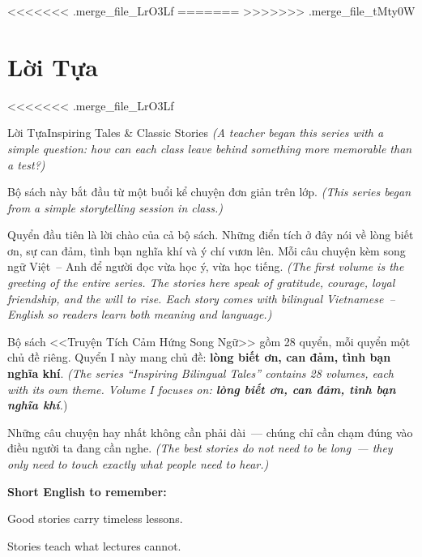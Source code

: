 <<<<<<< .merge_file_LrO3Lf
=======
>>>>>>> .merge_file_tMty0W
\chapter*{Lời Tựa}

<<<<<<< .merge_file_LrO3Lf
\begin{truyen}{Lời Tựa}{Inspiring Tales \& Classic Stories}
\textit{(A teacher began this series with a simple question: how can each class leave behind something more memorable than a test?)}

Bộ sách này bắt đầu từ một buổi kể chuyện đơn giản trên lớp.
\textit{(This series began from a simple storytelling session in class.)}

Quyển đầu tiên là lời chào của cả bộ sách. Những điển tích ở đây nói về lòng biết ơn, sự can đảm, tình bạn nghĩa khí và ý chí vươn lên. Mỗi câu chuyện kèm song ngữ Việt~-- Anh để người đọc vừa học ý, vừa học tiếng.
\textit{(The first volume is the greeting of the entire series. The stories here speak of gratitude, courage, loyal friendship, and the will to rise. Each story comes with bilingual Vietnamese~-- English so readers learn both meaning and language.)}

Bộ sách <<Truyện Tích Cảm Hứng Song Ngữ>> gồm 28 quyển, mỗi quyển một chủ đề riêng. Quyển I này mang chủ đề: \textbf{lòng biết ơn, can đảm, tình bạn nghĩa khí}.
\textit{(The series ``Inspiring Bilingual Tales'' contains 28 volumes, each with its own theme. Volume I focuses on: \textbf{lòng biết ơn, can đảm, tình bạn nghĩa khí}.})
\end{truyen}

\begin{baihoc}
Những câu chuyện hay nhất không cần phải dài~--- chúng chỉ cần chạm đúng vào điều người ta đang cần nghe.
\textit{(The best stories do not need to be long~--- they only need to touch exactly what people need to hear.)}
\end{baihoc}

\begin{ghinhoanh}
\textbf{Short English to remember:}

Good stories carry timeless lessons.

Stories teach what lectures cannot.
\end{ghinhoanh}

